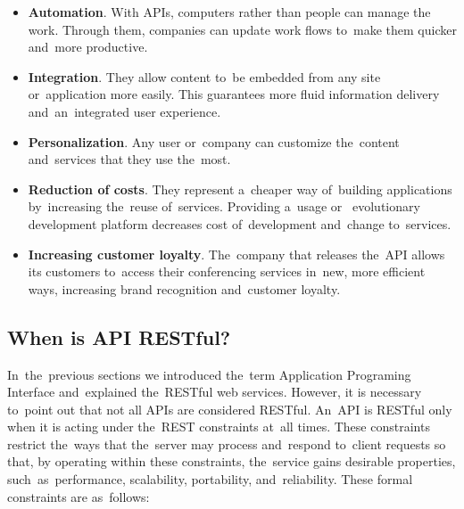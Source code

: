 \begin{itemize}
  \item \textbf{Automation}. With APIs, computers rather than people can manage
  the work. Through them, companies can update work flows to~make them quicker
  and~more productive.
  \item \textbf{Integration}. They allow content to~be embedded from any site
  or~application more easily. This guarantees more fluid information delivery
  and~an~integrated user experience.
  \item \textbf{Personalization}. Any user or~company can customize the~content
  and~services that they use the~most.
  \item \textbf{Reduction of costs}. They represent a~cheaper way of~building
  applications by~increasing the~reuse of~services. Providing a~usage or~
  evolutionary development platform decreases cost of~development and~change
  to~services.
  \item \textbf{Increasing customer loyalty}. The~company that releases
  the~API allows its customers to~access their conferencing services in~new,
  more efficient ways, increasing brand recognition and~customer loyalty.
\end{itemize}

\subsection{When is API RESTful?}
In~the~previous sections we introduced the~term Application Programing
Interface and~explained the~RESTful web services. However, it is necessary
to~point out that not all APIs are considered RESTful. An~API is RESTful only
when it is acting under the~REST constraints at~all times. These constraints
restrict the~ways that the~server may process and~respond to~client requests so
that, by operating within these constraints, the~service gains desirable
 properties, such~as~performance, scalability, portability,
and~reliability. These formal constraints are as~follows:


